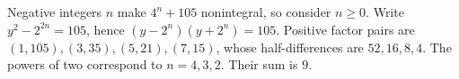Negative integers $n$ make $4^n+105$ nonintegral, so consider $n\ge0$. Write $y^2-2^{2n}=105$, hence $(y-2^n)(y+2^n)=105$. Positive factor pairs are $(1,105),(3,35),(5,21),(7,15)$, whose half-differences are $52,16,8,4$. The powers of two correspond to $n=4,3,2$. Their sum is $\boxed9$.
